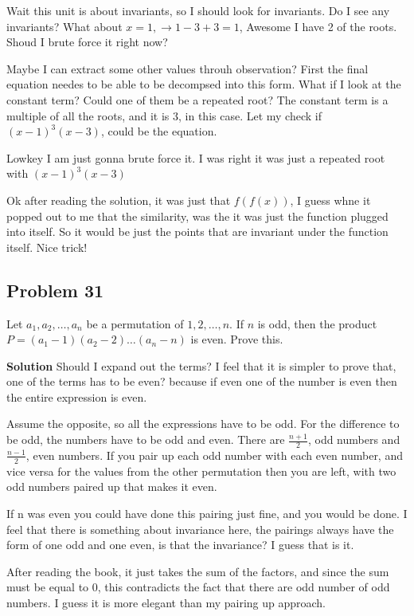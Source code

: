 \documentclass[12pt,tikz,border=10pt]{article}
\theoremstyle{definition}
\theoremstyle{remark}
\begin{document}
Wait this unit is about invariants, so I should look for invariants. Do I see any invariants?
What about $x=1, \rightarrow 1-3+3=1$, Awesome I have 2 of the roots. Shoud I brute force it right now?

Maybe I can extract some other values throuh observation? First the final equation needes to be able 
to be decompsed into this form. What if I look at the constant term? Could one of them be a repeated root? 
The constant term is a multiple of all the roots, and it is 3, in this case. Let my check if $(x-1)^3 (x-3)$, could be the equation.

Lowkey I am just gonna brute force it. I was right it was just a repeated root with $(x-1)^3(x-3)$

Ok after reading the solution, it was just that $f(f(x))$, I guess whne it popped out to me that the 
similarity, was the it was just the function plugged into itself. So it would be just the points that are invariant under the 
function itself. Nice trick!

\subsection{Problem 31}

Let $a_1, a_2, \ldots, a_n$ be a permutation of $1, 2, \ldots, n$. If $n$ is odd, then the product
$P = (a_1 - 1)(a_2 - 2) \ldots (a_n - n)$ is even. Prove this.

\textbf{Solution}
Should I expand out the terms? I feel that it is simpler to prove that, one of the terms has to be even?
because if even one of the number is even then the entire expression is even.

Assume the opposite, so all the expressions have to be odd. For the difference to be odd, 
the numbers have to be odd and even. There are $\frac{n+1}{2}$, odd numbers and $\frac{n-1}{2}$,
even numbers. If you pair up each odd number with each even number, and vice versa for the values from the 
other permutation then you are left, with two odd numbers paired up that makes it even.

If n was even you could have done this pairing just fine, and you would be done. I feel that there is something
about invariance here, the pairings always have the form of one odd and one even, is that the invariance? I guess that is it.

After reading the book, it just takes the sum of the factors, and since the sum must be equal to 0, this contradicts
the fact that there are odd number of odd numbers. I guess it is more elegant than my pairing up approach. 
\end{document}
